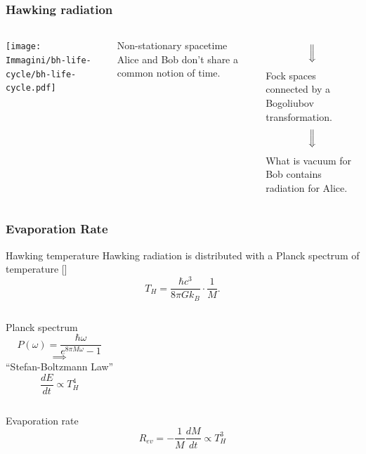 \documentclass[]{beamer}
\begin{document}
	\begin{frame}
		\frametitle{Hawking radiation}
		\begin{columns}
			\texttt{[image: Immagini/bh-life-cycle/bh-life-cycle.pdf]}
			\centering
			\vskip -5pt
			\begin{ideablock}{Non-stationary spacetime}
				\centering
				Alice and Bob don't share a common notion of time.
			\end{ideablock}
			\vskip -17pt
			\[
			\Big\Downarrow
			\]
			Fock spaces connected by a Bogoliubov transformation.
			\[
			\Big\Downarrow
			\]
			\vskip -7pt
			What is vacuum for Bob contains radiation for Alice.
		\end{columns}
	\end{frame}
	\begin{frame}
		\frametitle{Evaporation Rate}
		\begin{defblock}{Hawking temperature}
			Hawking radiation is distributed with a Planck spectrum of temperature [\cite[]{hawking1975particle}]
			\[
				T_H = \frac{\hbar c^3}{8\pi Gk_B}\cdot \frac{1}{M}.
			\]
		\end{defblock}
		\vskip 10pt
		\begin{columns}
			\column{0.45\textwidth}
			\centering
			Planck spectrum
			\[
				P(\omega) = \frac{\hbar\omega}{e^{8\pi M\omega} - 1}
			\]
			\column{0.1\textwidth}
			\[
			\implies	
			\]
			\column{0.45\textwidth}
			\centering
			``Stefan-Boltzmann Law''
			\[
			\frac{dE}{dt} \propto T_H^4	
			\]
		\end{columns}
		\vskip 10pt
		\begin{theoblock}{Evaporation rate}
			\[
			R_{ev} = -\frac{1}{M}\frac{dM}{dt} \propto T_H^3	
			\]
		\end{theoblock}
	\end{frame}
\end{document}
